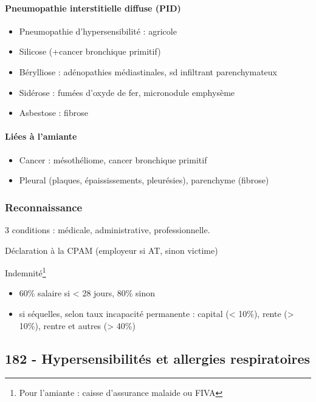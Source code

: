 \documentclass[11pt]{article}
\begin{document}
\paragraph{Pneumopathie interstitielle diffuse (PID)}
\label{sec:org10543b4}

\begin{itemize}
\item Pneumopathie d'hypersensibilité : agricole
\item Silicose (+cancer bronchique primitif)
\item Bérylliose : adénopathies médiastinales, sd infiltrant parenchymateux
\item Sidérose : fumées d'oxyde de fer, micronodule \textpm{} emphysème
\item Asbestose : fibrose
\end{itemize}

\paragraph{Liées à l'amiante}
\label{sec:org11547d3}

\begin{itemize}
\item Cancer : mésothéliome, cancer bronchique primitif
\item Pleural (plaques, épaississements, pleurésies), parenchyme (fibrose)
\end{itemize}

\subsubsection{Reconnaissance}
\label{sec:org7efcee4}
3 conditions : médicale, administrative, professionnelle. 

Déclaration à la CPAM (employeur si AT, sinon victime)

Indemnité\footnote{Pour l'amiante : caisse d'assurance malaide ou FIVA}

\begin{itemize}
\item 60\% salaire si < 28 jours, 80\% sinon
\item si séquelles, selon taux incapacité permanente : capital (< 10\%), rente
(> 10\%), rentre et autres (> 40\%)
\end{itemize}

\subsection{182 \textdagger{} - Hypersensibilités et allergies respiratoires}
\label{sec:org47f0cfe}
\label{sec:182_hypersensibilites_et_allergies_respiratoires}
\end{document}
